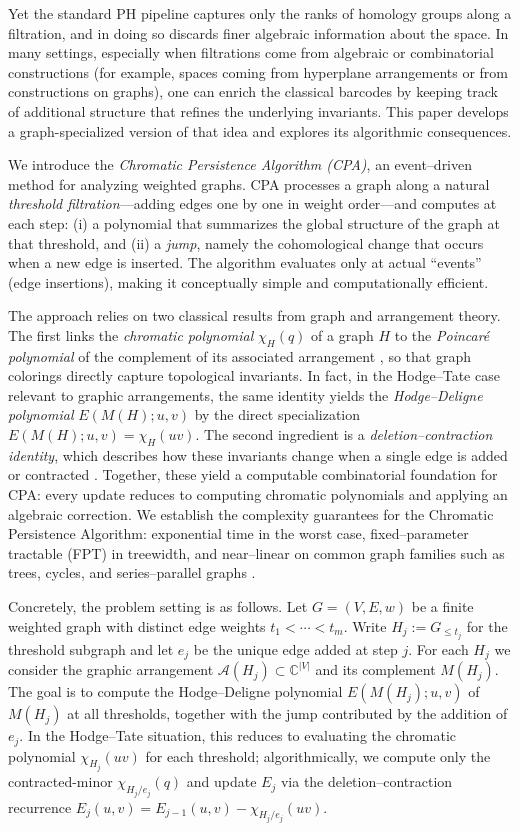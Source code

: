 \documentclass[runningheads]{llncs}
\begin{document}
Yet the standard PH pipeline captures only the ranks of homology groups along a
filtration, and in doing so discards finer algebraic information about the space. 
In many settings, especially when filtrations come from algebraic or 
combinatorial constructions (for example, spaces coming from hyperplane arrangements or from constructions on graphs), one can enrich the classical barcodes by keeping track 
of additional structure that refines the underlying invariants. 
This paper develops a graph-specialized version of that idea and explores its 
algorithmic consequences.

We introduce the \emph{Chromatic Persistence Algorithm (CPA)}, an event–driven
method for analyzing weighted graphs. CPA processes a graph along a natural
\emph{threshold filtration}—adding edges one by one in weight order—and
computes at each step: (i) a polynomial that summarizes the global structure
of the graph at that threshold, and (ii) a \emph{jump}, namely the cohomological 
change that occurs when a new edge is inserted. The algorithm evaluates only at
actual ``events'' (edge insertions), making it conceptually simple and
computationally efficient.

The approach relies on two classical results from graph and arrangement theory.
The first links the \emph{chromatic polynomial} $\chi_H(q)$ of a graph $H$ to the
\emph{Poincar\'e polynomial} of the complement of its associated arrangement
\cite{OrlikSolomon1980,OrlikTerao1992,Dimca2017,BaranovskySazdanovic2012}, so that graph
colorings directly capture topological invariants. In fact, in the Hodge--Tate case relevant to graphic arrangements, the same identity yields the
\emph{Hodge--Deligne polynomial} $E(M(H);u,v)$ by the direct specialization
$E(M(H);u,v)=\chi_H(uv).$
The second ingredient is a \emph{deletion–contraction identity}, which describes 
how these invariants change when a single edge is added or contracted
\cite{Dimca2017}. Together, these yield a computable combinatorial foundation for CPA: 
every update reduces to computing chromatic polynomials and applying an algebraic 
correction. We establish the complexity guarantees for the Chromatic Persistence 
Algorithm: exponential time in the worst case, fixed–parameter tractable (FPT) in 
treewidth, and near–linear on common graph families such as trees, cycles, and 
series–parallel graphs 
\cite{JaegerVertiganWelsh1990,Noble1998,Bodlaender1996,Cygan2015}.

Concretely, the problem setting is as follows. 
Let $G=(V,E,w)$ be a finite weighted graph with distinct edge weights 
$t_1<\cdots<t_m$. Write $H_j:=G_{\le t_j}$ for the threshold subgraph and 
let $e_j$ be the unique edge added at step $j$. For each $H_j$ we consider 
the graphic arrangement $\mathcal{A}(H_j)\subset\mathbb{C}^{|V|}$ and its 
complement $M(H_j)$. The goal is to compute the Hodge--Deligne polynomial 
$E(M(H_j);u,v)$ of $M(H_j)$ at all thresholds, together with the jump contributed 
by the addition of $e_j$. In the Hodge–Tate situation, this reduces to evaluating the chromatic polynomial 
$\chi_{H_j}(uv)$ for each threshold; algorithmically, we compute only the 
contracted-minor $\chi_{H_j/e_j}(q)$ and update $E_j$ via the deletion--contraction 
recurrence $E_j(u,v)=E_{j-1}(u,v)-\chi_{H_j/e_j}(uv)$.
\end{document}
